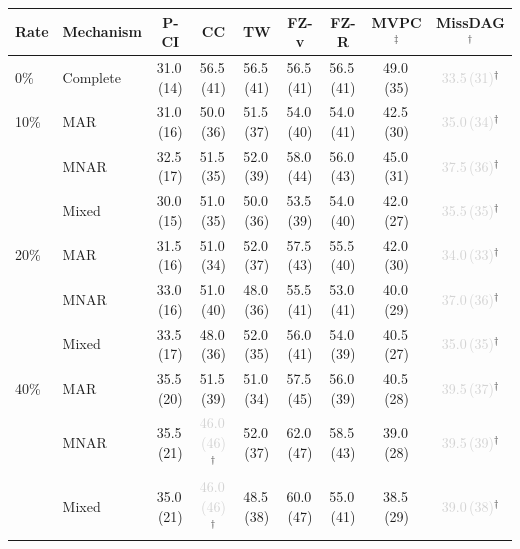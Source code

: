 \begin{tabular}{llccccccc}
    \toprule
    Rate & Mechanism & P-CI & CC & TW & FZ-v & FZ-R & MVPC$^\ddagger$ & MissDAG$^\dagger$ \\
    \midrule
    0\% & Complete & 31.0\,{\scriptsize(14)} & 56.5\,{\scriptsize(41)} & 56.5\,{\scriptsize(41)} & 56.5\,{\scriptsize(41)} & 56.5\,{\scriptsize(41)} & 49.0\,{\scriptsize(35)} & \textcolor{lightgray}{33.5\,{\scriptsize(31)}}$^\dagger$ \\
    \midrule
    10\% & MAR   & 31.0\,{\scriptsize(16)} & 50.0\,{\scriptsize(36)} & 51.5\,{\scriptsize(37)} & 54.0\,{\scriptsize(40)} & 54.0\,{\scriptsize(41)} & 42.5\,{\scriptsize(30)} & \textcolor{lightgray}{35.0\,{\scriptsize(34)}}$^\dagger$ \\
         & MNAR  & 32.5\,{\scriptsize(17)} & 51.5\,{\scriptsize(35)} & 52.0\,{\scriptsize(39)} & 58.0\,{\scriptsize(44)} & 56.0\,{\scriptsize(43)} & 45.0\,{\scriptsize(31)} & \textcolor{lightgray}{37.5\,{\scriptsize(36)}}$^\dagger$ \\
         & Mixed & 30.0\,{\scriptsize(15)} & 51.0\,{\scriptsize(35)} & 50.0\,{\scriptsize(36)} & 53.5\,{\scriptsize(39)} & 54.0\,{\scriptsize(40)} & 42.0\,{\scriptsize(27)} & \textcolor{lightgray}{35.5\,{\scriptsize(35)}}$^\dagger$ \\
    \midrule
    20\% & MAR   & 31.5\,{\scriptsize(16)} & 51.0\,{\scriptsize(34)} & 52.0\,{\scriptsize(37)} & 57.5\,{\scriptsize(43)} & 55.5\,{\scriptsize(40)} & 42.0\,{\scriptsize(30)} & \textcolor{lightgray}{34.0\,{\scriptsize(33)}}$^\dagger$ \\
         & MNAR  & 33.0\,{\scriptsize(16)} & 51.0\,{\scriptsize(40)} & 48.0\,{\scriptsize(36)} & 55.5\,{\scriptsize(41)} & 53.0\,{\scriptsize(41)} & 40.0\,{\scriptsize(29)} & \textcolor{lightgray}{37.0\,{\scriptsize(36)}}$^\dagger$ \\
         & Mixed & 33.5\,{\scriptsize(17)} & 48.0\,{\scriptsize(36)} & 52.0\,{\scriptsize(35)} & 56.0\,{\scriptsize(41)} & 54.0\,{\scriptsize(39)} & 40.5\,{\scriptsize(27)} & \textcolor{lightgray}{35.0\,{\scriptsize(35)}}$^\dagger$ \\
    \midrule
    40\% & MAR   & 35.5\,{\scriptsize(20)} & 51.5\,{\scriptsize(39)} & 51.0\,{\scriptsize(34)} & 57.5\,{\scriptsize(45)} & 56.0\,{\scriptsize(39)} & 40.5\,{\scriptsize(28)} & \textcolor{lightgray}{39.5\,{\scriptsize(37)}}$^\dagger$ \\
         & MNAR  & 35.5\,{\scriptsize(21)} & \textcolor{lightgray}{46.0\,{\scriptsize(46)}}$^\dagger$ & 52.0\,{\scriptsize(37)} & 62.0\,{\scriptsize(47)} & 58.5\,{\scriptsize(43)} & 39.0\,{\scriptsize(28)} & \textcolor{lightgray}{39.5\,{\scriptsize(39)}}$^\dagger$ \\
         & Mixed & 35.0\,{\scriptsize(21)} & \textcolor{lightgray}{46.0\,{\scriptsize(46)}}$^\dagger$ & 48.5\,{\scriptsize(38)} & 60.0\,{\scriptsize(47)} & 55.0\,{\scriptsize(41)} & 38.5\,{\scriptsize(29)} & \textcolor{lightgray}{39.0\,{\scriptsize(38)}}$^\dagger$ \\
    \bottomrule
\end{tabular}
